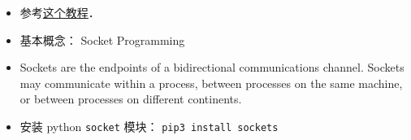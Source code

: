 
\begin{itemize}
\item 参考\href{https://www.tutorialspoint.com/python/python_networking.htm}{这个教程}．
\item 基本概念： Socket Programming
\item Sockets are the endpoints of a bidirectional communications channel. Sockets may communicate within a process, between processes on the same machine, or between processes on different continents.
\item 安装 python \verb|socket| 模块： \verb|pip3 install sockets|
\end{itemize}
